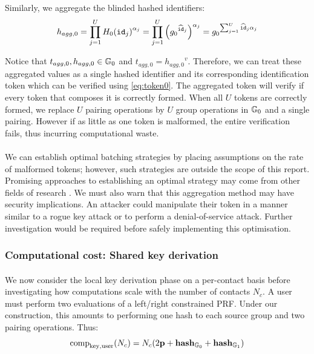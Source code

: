 	\noindent Similarly, we aggregate the blinded hashed identifiers:
	\begin{equation}
		h_{agg,0} = \prod_{j=1}^{U} {H_0(\mathtt{id}_j)}^{\alpha_j} = \prod_{j=1}^{U} \left({g_0}^{\widehat{\mathtt{id}}_j}\right)^{\alpha_j} = {g_0}^{\sum_{j = 1}^U \widehat{\mathtt{id}}_j\alpha_j}
	\end{equation}
	
	\noindent Notice that $t_{agg,0}, h_{agg,0} \in \mathbb{G}_0$ and $t_{agg,0} = {h_{agg,0}}^v$. Therefore, we can treat these aggregated values as a single hashed identifier and its corresponding identification token which can be verified using \autoref{eq:token0}. The aggregated token will verify if every token that composes it is correctly formed. When all $U$ tokens are correctly formed, we replace $U$ pairing operations by $U$ group operations in $\mathbb{G}_0$ and a single pairing. However if as little as one token is malformed, the entire verification fails, thus incurring computational waste.
	
	
	\paragraph{} We can establish optimal batching strategies by placing assumptions on the rate of malformed tokens; however, such strategies are outside the scope of this report. Promising approaches to establishing an optimal strategy may come from other fields of research \cite{covid}. We must also warn that this aggregation method may have security implications. An attacker could manipulate their token in a manner similar to a rogue key attack or to perform a denial-of-service attack. Further investigation would be required before safely implementing this optimisation.
	
	\subsubsection{Computational cost: Shared key derivation}
	
	\paragraph{} We now consider the local key derivation phase on a per-contact basis before investigating how computations scale with the number of contacts $N_c$. A user must perform two evaluations of a left/right constrained PRF. Under our construction, this amounts to performing one hash to each source group and two pairing operations. Thus:
	\begin{equation}
		\mathrm{comp}_{\mathrm{key, user}}(N_c) = N_c(2\mathbf{p} + \mathbf{hash}_{\mathbb{G}_0} + \mathbf{hash}_{\mathbb{G}_1})
	\end{equation}
	

